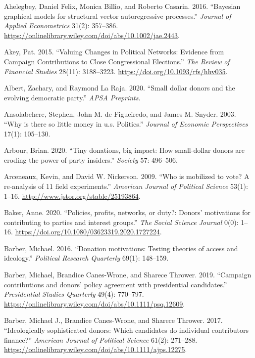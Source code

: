 \documentclass[12pt,]{article}
\begin{document}
\hypertarget{refs}{}
\leavevmode\hypertarget{ref-bic}{}%
Ahelegbey, Daniel Felix, Monica Billio, and Roberto Casarin. 2016.
``Bayesian graphical models for structural vector autoregressive
processes.'' \emph{Journal of Applied Econometrics} 31(2): 357--386.
\url{https://onlinelibrary.wiley.com/doi/abs/10.1002/jae.2443}.

\leavevmode\hypertarget{ref-akey2015}{}%
Akey, Pat. 2015. ``Valuing Changes in Political Networks: Evidence from
Campaign Contributions to Close Congressional Elections.'' \emph{The
Review of Financial Studies} 28(11): 3188--3223.
\url{https://doi.org/10.1093/rfs/hhv035}.

\leavevmode\hypertarget{ref-albert2020}{}%
Albert, Zachary, and Raymond La Raja. 2020. ``Small dollar donors and
the evolving democratic party.'' \emph{APSA Preprints}.

\leavevmode\hypertarget{ref-ansolabehere2003}{}%
Ansolabehere, Stephen, John M. de Figueiredo, and James M. Snyder. 2003.
``Why is there so little money in u.s. Politics.'' \emph{Journal of
Economic Perspectives} 17(1): 105--130.

\leavevmode\hypertarget{ref-arbour2020}{}%
Arbour, Brian. 2020. ``Tiny donations, big impact: How small-dollar
donors are eroding the power of party insiders.'' \emph{Society} 57:
496--506.

\leavevmode\hypertarget{ref-arceneaux2009}{}%
Arceneaux, Kevin, and David W. Nickerson. 2009. ``Who is mobilized to
vote? A re-analysis of 11 field experiments.'' \emph{American Journal of
Political Science} 53(1): 1--16.
\url{http://www.jstor.org/stable/25193864}.

\leavevmode\hypertarget{ref-baker2020a}{}%
Baker, Anne. 2020. ``Policies, profits, networks, or duty?: Donors'
motivations for contributing to parties and interest groups.'' \emph{The
Social Science Journal} 0(0): 1--16.
\url{https://doi.org/10.1080/03623319.2020.1727224}.

\leavevmode\hypertarget{ref-barber2016a}{}%
Barber, Michael. 2016. ``Donation motivations: Testing theories of
access and ideology.'' \emph{Political Research Quarterly} 69(1):
148--159.

\leavevmode\hypertarget{ref-barber2019}{}%
Barber, Michael, Brandice Canes-Wrone, and Sharece Thrower. 2019.
``Campaign contributions and donors' policy agreement with presidential
candidates.'' \emph{Presidential Studies Quarterly} 49(4): 770--797.
\url{https://onlinelibrary.wiley.com/doi/abs/10.1111/psq.12609}.

\leavevmode\hypertarget{ref-barber2017}{}%
Barber, Michael J., Brandice Canes-Wrone, and Sharece Thrower. 2017.
``Ideologically sophisticated donors: Which candidates do individual
contributors finance?'' \emph{American Journal of Political Science}
61(2): 271--288.
\url{https://onlinelibrary.wiley.com/doi/abs/10.1111/ajps.12275}.
\end{document}

